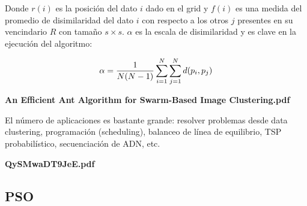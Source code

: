 Donde $r(i)$ es la posici\'on del dato $i$ dado en el grid y $f(i)$ es una medida
del promedio de disimilaridad del dato $i$ con respecto a los otros $j$
presentes en su vencindario $R$ con tama\~no $s \times s$. $\alpha$
es la escala de disimilaridad y es clave en la ejecuci\'on del algoritmo:

\[
\alpha = {{1 \over {N(N-1)}} \sum_{i=1}^N \sum_{j=1}^N d(p_i,p_j)}
\]

{\bf An Efficient Ant Algorithm for Swarm-Based Image Clustering.pdf}

El n\'umero de aplicaciones es bastante grande: resolver problemas
desde data clustering, programaci\'on (scheduling), balanceo
de l\'inea de equilibrio, TSP probabil\'istico, secuenciaci\'on de 
ADN, etc. 

{\bf QySMwaDT9JeE.pdf}


\subsection{PSO}
